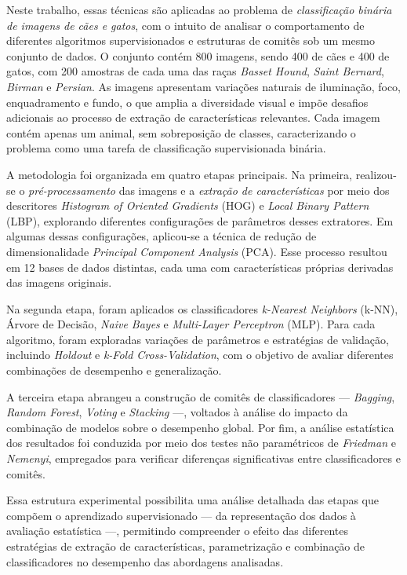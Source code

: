 \documentclass[12pt]{article}
\begin{document}
Neste trabalho, essas técnicas são aplicadas ao problema de \textit{classificação binária de imagens de cães e gatos}, com o intuito de analisar o comportamento de diferentes algoritmos supervisionados e estruturas de comitês sob um mesmo conjunto de dados. O conjunto contém 800 imagens, sendo 400 de cães e 400 de gatos, com 200 amostras de cada uma das raças \textit{Basset Hound}, \textit{Saint Bernard}, \textit{Birman} e \textit{Persian}. As imagens apresentam variações naturais de iluminação, foco, enquadramento e fundo, o que amplia a diversidade visual e impõe desafios adicionais ao processo de extração de características relevantes. Cada imagem contém apenas um animal, sem sobreposição de classes, caracterizando o problema como uma tarefa de classificação supervisionada binária.

A metodologia foi organizada em quatro etapas principais. Na primeira, realizou-se o \textit{pré-processamento} das imagens e a \textit{extração de características} por meio dos descritores \textit{Histogram of Oriented Gradients} (HOG) e \textit{Local Binary Pattern} (LBP), explorando diferentes configurações de parâmetros desses extratores. Em algumas dessas configurações, aplicou-se a técnica de redução de dimensionalidade \textit{Principal Component Analysis} (PCA). Esse processo resultou em 12 bases de dados distintas, cada uma com características próprias derivadas das imagens originais.

Na segunda etapa, foram aplicados os classificadores \textit{k-Nearest Neighbors} (k-NN), Árvore de Decisão, \textit{Naive Bayes} e \textit{Multi-Layer Perceptron} (MLP). Para cada algoritmo, foram exploradas variações de parâmetros e estratégias de validação, incluindo \textit{Holdout} e \textit{k-Fold Cross-Validation}, com o objetivo de avaliar diferentes combinações de desempenho e generalização.

A terceira etapa abrangeu a construção de comitês de classificadores — \textit{Bagging}, \textit{Random Forest}, \textit{Voting} e \textit{Stacking} —, voltados à análise do impacto da combinação de modelos sobre o desempenho global. Por fim, a análise estatística dos resultados foi conduzida por meio dos testes não paramétricos de \textit{Friedman} e \textit{Nemenyi}, empregados para verificar diferenças significativas entre classificadores e comitês.

Essa estrutura experimental possibilita uma análise detalhada das etapas que compõem o aprendizado supervisionado — da representação dos dados à avaliação estatística —, permitindo compreender o efeito das diferentes estratégias de extração de características, parametrização e combinação de classificadores no desempenho das abordagens analisadas.
\end{document}
